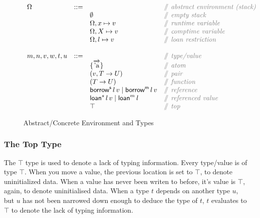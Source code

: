 \documentclass[12pt,twoside]{report}
\begin{document}
\begin{figure}[H]
  \arraycolsep=1pt %
  \centering

  \vspace{-2ex} %
  \[
  \begin{array}[t]{llll}
    \Omega & ::= & & \comment{abstract environment (stack)} \\
    && \emptyset & \comment{empty stack} \\
    && \Omega, x \mapsto v & \comment{runtime variable} \\
    && \Omega, X \mapsto v & \comment{comptime variable} \\
    && \Omega, l \mapsto v & \comment{loan restriction} \\
    \\
    m, n, v, w, t, u & ::= & & \comment{type/value} \\
    && \{\overrightarrow{\atom{a}}\} & \comment{atom} \\
    && (v, T \rightarrow U) & \comment{pair} \\
    && (T \rightarrow U) & \comment{function} \\
    && \borrows{l}{v} \mid \borrowm{l}{v} & \comment{reference} \\
    && \loans{l}{v} \mid \loanm{l} & \comment{referenced value} \\
    && \top & \comment{top} \\
  \end{array} %
  \]
\caption{Abstract/Concrete Environment and Types} %
\label{fig:stack} %
\end{figure} %

\subsubsection{The Top Type}
The $\top$ type is used to denote a lack of typing information. Every type/value is of type $\top$. When you move a value, the previous location is set to $\top$, to denote uninitialized data. When a value has never been writen to before, it's value is $\top$, again, to denote uninitialised data. When a type $t$ depends on another type $u$, but $u$ has not been narrowed down enough to deduce the type of $t$, $t$ evaluates to $\top$ to denote the lack of typing information.
\end{document}

